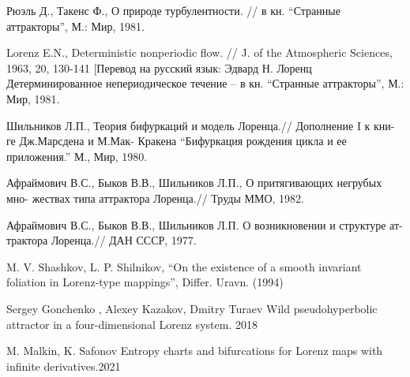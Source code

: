 \documentclass[14pt]{article}
\theoremstyle{definition}
\begin{document}
\newpage
{}
\begin{thebibliography}{99}

Рюэль Д., Такенс Ф., О природе турбулентности. // в кн. “Странные аттракторы”, М.: Мир, 1981.

 Lorenz E.N., Deterministic nonperiodic flow. // J. of the Atmospheric Sciences, 1963, 20, 130-141 [Перевод на русский язык: Эдвард Н. Лоренц Детерминированное непериодическое течение – в кн. “Странные аттракторы”, М.: Мир, 1981.


 Шильников Л.П., Теория бифуркаций и модель Лоренца.// Дополнение I к кни- ге Дж.Марсдена и М.Мак- Кракена “Бифуркация рождения цикла и ее приложения.” М., Мир, 1980.

 Афраймович В.С., Быков В.В., Шильников Л.П., О притягивающих негрубых мно- жествах типа аттрактора Лоренца.// Труды ММО, 1982.

 Афраймович В.С., Быков В.В., Шильников Л.П. О возникновении и структуре ат- трактора Лоренца.// ДАН СССР, 1977.

 M. V. Shashkov, L. P. Shilnikov, “On the existence of a smooth invariant foliation in Lorenz-type mappings”, Differ. Uravn. (1994)

 Sergey Gonchenko , Alexey Kazakov,  Dmitry Turaev Wild pseudohyperbolic attractor in a four-dimensional Lorenz system. 2018

 M. Malkin, K. Safonov Entropy charts and bifurcations for Lorenz maps with infinite derivatives.2021


\end{thebibliography}
\end{document}
